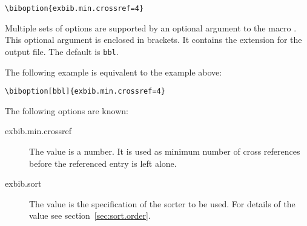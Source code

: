\begin{lstlisting}[language={[LaTeX]TeX}]
  \biboption{exbib.min.crossref=4}
\end{lstlisting}

Multiple sets of options are supported by an optional argument to
the macro . This optional argument is enclosed in
brackets. It contains the extension for the output file. The default
is \texttt{bbl}.

The following example is equivalent to the example above:

\begin{lstlisting}[language={[LaTeX]TeX}]
  \biboption[bbl]{exbib.min.crossref=4}
\end{lstlisting}

The following options are known:

\begin{description}
\item[exbib.min.crossref] The value is a number. It is used as minimum
  number of cross references before the referenced entry is left
  alone.
\item[exbib.sort] The value is the specification of the sorter to be
  used. For details of the value see section~\ref{sec:sort.order}.
\end{description}

\endinput
%

